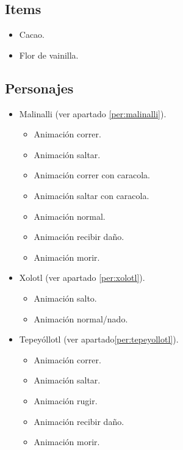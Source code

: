 	\subsection{Items}
\begin{itemize}
	\item 	Cacao.
	\item	Flor de vainilla.
\end{itemize}
	\subsection{Personajes}
\begin{itemize}
	\item Malinalli (ver apartado \ref{per:malinalli}).
		\begin{itemize}
			\item Animación correr.
			\item Animación saltar.
			\item Animación correr con caracola.
			\item Animación saltar con caracola.
			\item Animación normal.
			\item Animación recibir daño.
			\item Animación morir.
		\end{itemize}
	\item Xolotl (ver apartado \ref{per:xolotl}).
		\begin{itemize}
				\item Animación salto.
				\item Animación normal/nado.
		\end{itemize}
	\item Tepeyóllotl (ver apartado\ref{per:tepeyollotl}).
		\begin{itemize}
			\item Animación correr.
			\item Animación saltar.
			\item Animación rugir.
			\item Animación recibir daño.
			\item Animación morir.
		\end{itemize}
\end{itemize}
